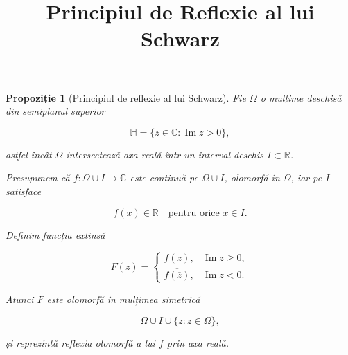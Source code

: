 \documentclass[12pt]{article}
\title{\Large\textbf{Principiul de Reflexie al lui Schwarz}}
\date{}
\theoremstyle{plain}
\newtheorem{proposition}{Propoziție}
\begin{document}
\maketitle

\begin{proposition}[Principiul de reflexie al lui Schwarz]
Fie $\Omega$ o mulțime deschisă din semiplanul superior


\[
\mathbb{H} = \{ z \in \mathbb{C} : \operatorname{Im} z > 0 \},
\]


astfel încât $\Omega$ intersectează axa reală într-un interval deschis $I \subset \mathbb{R}$.

Presupunem că $f : \Omega \cup I \to \mathbb{C}$ este continuă pe $\Omega \cup I$, olomorfă în $\Omega$, iar pe $I$ satisface


\[
f(x) \in \mathbb{R} \quad \text{pentru orice } x \in I.
\]



Definim funcția extinsă


\[
F(z) =
\begin{cases}
f(z), & \operatorname{Im} z \ge 0, \\
\overline{f(\overline{z})}, & \operatorname{Im} z < 0.
\end{cases}
\]



Atunci $F$ este olomorfă în mulțimea simetrică


\[
\Omega \cup I \cup \{ \overline{z} : z \in \Omega \},
\]


și reprezintă reflexia olomorfă a lui $f$ prin axa reală.
\end{proposition}
\end{document}
